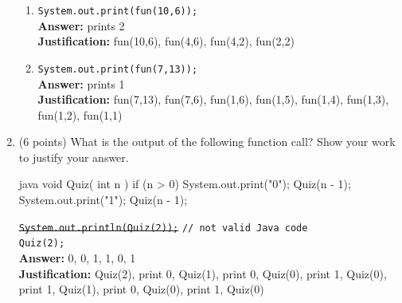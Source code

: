 \documentclass[12pt, a4paper]{article}
\begin{document}
\begin{enumerate}
\begin{enumerate}
        \item \verb|System.out.print(fun(10,6));| \\
        \hspace*{\fill} \textbf{Answer:} prints 2 \\
        \textbf{Justification:} fun(10,6), fun(4,6), fun(4,2), fun(2,2)

        \item \verb|System.out.print(fun(7,13));| \\
        \hspace*{\fill} \textbf{Answer:} prints 1 \\
        \textbf{Justification:} fun(7,13), fun(7,6), fun(1,6), fun(1,5), fun(1,4), fun(1,3), fun(1,2), fun(1,1)

    \end{enumerate}



    \newpage



    \item (6 points) What is the output of the following function call?
        Show your work to justify your answer.
    \begin{MintedUnbreakableCodeBlock}{java}
        void Quiz( int n ) {
            if (n > 0) {
                System.out.print("0");
                Quiz(n - 1);
                System.out.print("1");
                Quiz(n - 1);
            }
        }\end{MintedUnbreakableCodeBlock}

    \sout{\texttt{System.out.println(Quiz(2));}} \verb|// not valid Java code| \\
    \verb|Quiz(2);| \\
    \hspace*{\fill} \textbf{Answer:} 0, 0, 1, 1, 0, 1 \\
    \textbf{Justification:} Quiz(2),
        print 0,
        Quiz(1),
            print 0,
            Quiz(0),
            print 1,
            Quiz(0),
        print 1,
        Quiz(1),
            print 0,
            Quiz(0),
            print 1,
            Quiz(0)



    \newpage




\end{enumerate}
\end{document}
